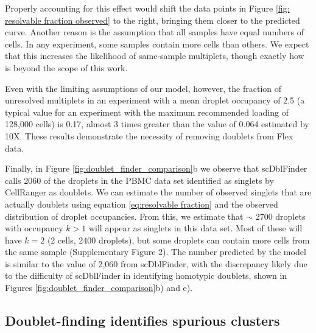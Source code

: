 \documentclass[unnumsec,webpdf,modern,large]{oup-authoring-template}
\begin{document}
	 Properly accounting for this effect would shift the data points in Figure \ref{fig: resolvable fraction observed} to the right, bringing them closer to the predicted curve. 	
	Another reason is the assumption that all samples have equal numbers of cells. 
	In any experiment, some samples contain more cells than others. We expect that this increases the likelihood of same-sample multiplets, though exactly how is beyond the scope of this work. 
	
	Even with the limiting assumptions of our model, however, the fraction of unresolved multiplets in an experiment with a mean droplet occupancy of 2.5 (a typical value for an experiment with the maximum recommended loading of 128,000 cells) is 0.17, almost 3 times greater than the value of 0.064 estimated by 10X. These results demonstrate the necessity of removing doublets from Flex data. 
		
	Finally, in Figure \ref{fig:doublet_finder_comparison}b we observe that scDblFinder calls 2060 of the droplets in the PBMC data set identified as singlets by CellRanger as doublets. 
	We can estimate the number of observed singlets that are actually doublets using equation \eqref{eq:resolvable fraction} and the observed distribution of droplet occupancies. 
	From this, we estimate that $\sim$ 2700 droplets with occupancy $k > 1$ will appear as singlets in this data set. 
	Most of these will have $k=2$ (2 cells, 2400 droplets), but some droplets can contain more cells from the same sample (Supplementary Figure 2). 
	The number predicted by the model is similar to the value of 2,060 from scDblFinder, with the discrepancy likely due to the difficulty of scDblFinder in identifying homotypic doublets, shown in Figures \ref{fig:doublet_finder_comparison}b) and e).
	
	\subsection{Doublet-finding identifies spurious clusters}
	
\end{document}
